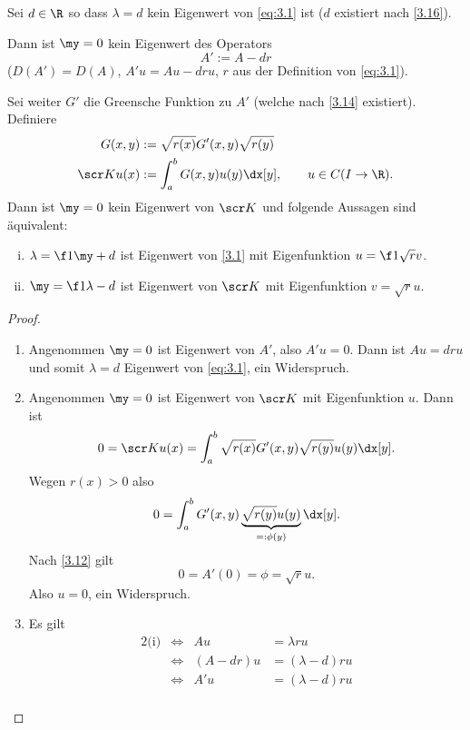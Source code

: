 \begin{st} \label{3.17}
	Sei $d\in \R$ so dass $\lambda = d$ kein Eigenwert von \eqref{eq:3.1} ist ($d$ existiert nach \ref{3.16}).

	Dann ist $\my = 0$ kein Eigenwert des Operators
	\[
		A' := A - dr
	\]
	($D(A') = D(A)$, $A'u = Au - dru$, $r$ aus der Definition von \eqref{eq:3.1}).

	Sei weiter $G'$ die Greensche Funktion zu $A'$ (welche nach \ref{3.14} existiert).
	Definiere
	\begin{align*}
		G(x,y) &:= \sqrt {r(x)} G'(x,y) \sqrt{r(y)} \\
		\scr K u(x) &:= \int_a^b G(x,y) u(y) \dx[y],  \qquad \text{$u\in C(I\to \R)$}.
	\end{align*}
	Dann ist $\my = 0$ kein Eigenwert von $\scr K$ und folgende Aussagen sind äquivalent:
	\begin{enumerate}[(i)]
		\item
			$\lambda = \f 1\my + d$ ist Eigenwert von \eqref{3.1} mit Eigenfunktion $u=\f 1{\sqrt r} v$.
		\item
			$\my = \f 1{\lambda -d}$ ist Eigenwert von $\scr K$ mit Eigenfunktion $v = \sqrt{r} u$.
	\end{enumerate}
	\begin{proof}
		\begin{enumerate}[1)]
			\item
				Angenommen $\my = 0$ ist Eigenwert von $A'$, also $A'u = 0$.
				Dann ist $Au = dru$ und somit $\lambda = d$ Eigenwert von \eqref{eq:3.1}, ein Widerspruch.
			\item
				Angenommen $\my = 0$ ist Eigenwert von $\scr K$ mit Eigenfunktion $u$.
				Dann ist
				\begin{align*}
					0 = \scr K u(x) = \int_a^b \sqrt{r(x)} G'(x,y) \sqrt{r(y)} u(y) \dx[y].
				\end{align*}
				Wegen $r(x) > 0$ also
				\begin{align*}
					0 = \int_a^b G'(x,y) \underbrace{\sqrt{r(y)} u(y)}_{=:\phi(y)} \dx[y].
				\end{align*}
				Nach \ref{3.12} gilt 
				\[
					0 = A'(0) = \phi = \sqrt{r} u.
				\]
				Also $u = 0$, ein Widerspruch.
			\item
				Es gilt
				\begin{alignat*}{2}
					\text{(i)} &\iff& Au &= \lambda ru \\
					&\iff& (A-dr)u &= (\lambda - d)ru \\
					&\iff& A' u &= (\lambda -d)ru \\ 

\end{alignat*}
\end{enumerate}
\end{proof}
\end{st}
